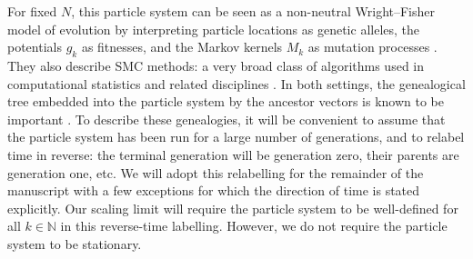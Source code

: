 \documentclass[a4paper,11pt]{article}
\theoremstyle{definition}
\newcommand{\bbN}{\mathbb{N}}
\begin{document}
For fixed $N$, this particle system can be seen as a non-neutral Wright--Fisher model of evolution by interpreting particle locations as genetic alleles, the potentials $g_k$ as fitnesses, and the Markov kernels $M_k$ as mutation processes \cite[Section 2]{delmoral2009}.
They also describe SMC methods: a very broad class of algorithms used in computational statistics and related disciplines \cite{chopin2020, delmoral2004}.
In both settings, the genealogical tree embedded into the particle system by the ancestor vectors is known to be important \cite{delmoral2016, delmoral2001b, delmoral2009, jacob2015, kingman1982coal, kingman1982gene, lee2018, mohle1998, mohle1999, mohle2001}.
To describe these genealogies, it will be convenient to assume that the particle system has been run for a large number of generations, and to relabel time in reverse: the terminal generation will be generation zero, their parents are generation one, etc.
We will adopt this relabelling for the remainder of the manuscript with a few exceptions for which the direction of time is stated explicitly.
Our scaling limit will require the particle system to be well-defined for all $k \in \bbN$ in this reverse-time labelling.
However, we do not require the particle system to be stationary.
\end{document}

